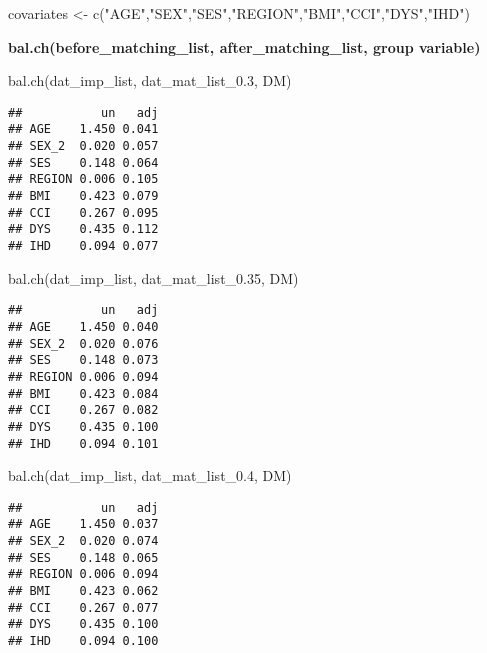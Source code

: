 \documentclass[
]{book}
\newenvironment{Shaded}{\begin{snugshade}}{\end{snugshade}}
\newcommand{\FloatTok}[1]{\textcolor[rgb]{0.00,0.00,0.81}{#1}}
\newcommand{\FunctionTok}[1]{\textcolor[rgb]{0.00,0.00,0.00}{#1}}
\newcommand{\NormalTok}[1]{#1}
\newcommand{\OtherTok}[1]{\textcolor[rgb]{0.56,0.35,0.01}{#1}}
\newcommand{\StringTok}[1]{\textcolor[rgb]{0.31,0.60,0.02}{#1}}
\theoremstyle{definition}
\theoremstyle{definition}
\theoremstyle{definition}
\theoremstyle{definition}
\theoremstyle{remark}
\begin{document}
\begin{Shaded}
\begin{Highlighting}[]
\NormalTok{covariates }\OtherTok{\textless{}{-}} \FunctionTok{c}\NormalTok{(}\StringTok{"AGE"}\NormalTok{,}\StringTok{"SEX"}\NormalTok{,}\StringTok{"SES"}\NormalTok{,}\StringTok{"REGION"}\NormalTok{,}\StringTok{"BMI"}\NormalTok{,}\StringTok{"CCI"}\NormalTok{,}\StringTok{"DYS"}\NormalTok{,}\StringTok{"IHD"}\NormalTok{)}
\end{Highlighting}
\end{Shaded}

\textbf{bal.ch(before\_matching\_list, after\_matching\_list, group variable)}

\begin{Shaded}
\begin{Highlighting}[]
\FunctionTok{bal.ch}\NormalTok{(dat\_imp\_list, dat\_mat\_list\_0}\FloatTok{.3}\NormalTok{, DM)}
\end{Highlighting}
\end{Shaded}

\begin{verbatim}
##           un   adj
## AGE    1.450 0.041
## SEX_2  0.020 0.057
## SES    0.148 0.064
## REGION 0.006 0.105
## BMI    0.423 0.079
## CCI    0.267 0.095
## DYS    0.435 0.112
## IHD    0.094 0.077
\end{verbatim}

\begin{Shaded}
\begin{Highlighting}[]
\FunctionTok{bal.ch}\NormalTok{(dat\_imp\_list, dat\_mat\_list\_0}\FloatTok{.35}\NormalTok{, DM)}
\end{Highlighting}
\end{Shaded}

\begin{verbatim}
##           un   adj
## AGE    1.450 0.040
## SEX_2  0.020 0.076
## SES    0.148 0.073
## REGION 0.006 0.094
## BMI    0.423 0.084
## CCI    0.267 0.082
## DYS    0.435 0.100
## IHD    0.094 0.101
\end{verbatim}

\begin{Shaded}
\begin{Highlighting}[]
\FunctionTok{bal.ch}\NormalTok{(dat\_imp\_list, dat\_mat\_list\_0}\FloatTok{.4}\NormalTok{, DM)}
\end{Highlighting}
\end{Shaded}

\begin{verbatim}
##           un   adj
## AGE    1.450 0.037
## SEX_2  0.020 0.074
## SES    0.148 0.065
## REGION 0.006 0.094
## BMI    0.423 0.062
## CCI    0.267 0.077
## DYS    0.435 0.100
## IHD    0.094 0.100
\end{verbatim}
\end{document}
